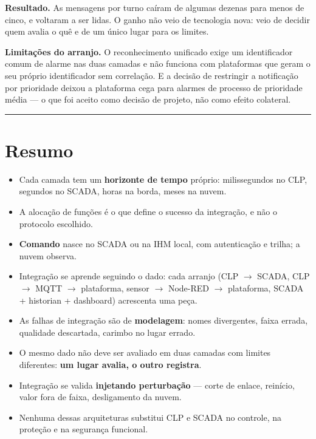 \textbf{Resultado.} As mensagens por turno caíram de algumas dezenas para menos de cinco, e voltaram a ser
lidas. O ganho não veio de tecnologia nova: veio de decidir quem avalia o quê e de um único lugar
para os limites.

\textbf{Limitações do arranjo.} O reconhecimento unificado exige um identificador comum de alarme nas duas
camadas e não funciona com plataformas que geram o seu próprio identificador sem correlação. E a
decisão de restringir a notificação por prioridade deixou a plataforma cega para alarmes de processo
de prioridade média --- o que foi aceito como decisão de projeto, não como efeito colateral.

\begin{center}\rule{0.5\linewidth}{0.5pt}\end{center}

\section{Resumo}\label{resumo}

\begin{itemize}
\tightlist
\item
  Cada camada tem um \textbf{horizonte de tempo} próprio: milissegundos no CLP, segundos no SCADA, horas na borda, meses na nuvem.
\item
  A alocação de funções é o que define o sucesso da integração, e não o protocolo escolhido.
\item
  \textbf{Comando} nasce no SCADA ou na IHM local, com autenticação e trilha; a nuvem observa.
\item
  Integração se aprende seguindo o dado: cada arranjo (CLP \ensuremath{\rightarrow} SCADA, CLP \ensuremath{\rightarrow} MQTT \ensuremath{\rightarrow} plataforma, sensor \ensuremath{\rightarrow} Node-RED \ensuremath{\rightarrow} plataforma, SCADA + historian + dashboard) acrescenta uma peça.
\item
  As falhas de integração são de \textbf{modelagem}: nomes divergentes, faixa errada, qualidade descartada, carimbo no lugar errado.
\item
  O mesmo dado não deve ser avaliado em duas camadas com limites diferentes: \textbf{um lugar avalia, o outro registra}.
\item
  Integração se valida \textbf{injetando perturbação} --- corte de enlace, reinício, valor fora de faixa, desligamento da nuvem.
\item
  Nenhuma dessas arquiteturas substitui CLP e SCADA no controle, na proteção e na segurança funcional.
\end{itemize}


